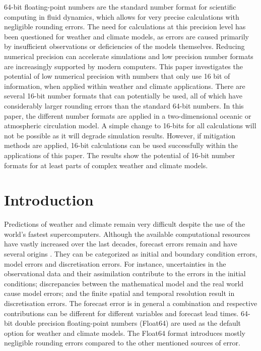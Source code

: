 \documentclass[draft]{agujournal2019}
\begin{document}
64-bit floating-point numbers are the standard number format for scientific
computing in fluid dynamics, which allows for very precise calculations with
negligible rounding errors. The need for calculations at this precision level
has been questioned for weather and climate models, as errors are caused
primarily by insufficient observations or deficiencies of the models themselves.
Reducing numerical precision can accelerate simulations and low precision number
formats are increasingly supported by modern computers. This paper investigates
the potential of low numerical precision with numbers that only use 16 bit of
information, when applied within weather and climate applications. There are
several 16-bit number formats that can potentially be used, all of which have
considerably larger rounding errors than the standard 64-bit numbers. In this
paper, the different number formats are applied in a two-dimensional oceanic or
atmospheric circulation model. A simple change to 16-bits for all calculations
will not be possible as it will degrade simulation results. However, if mitigation
methods are applied, 16-bit calculations can be used successfully within the
applications of this paper. The results show the potential of 16-bit number
formats for at least parts of complex weather and climate models.

\section{Introduction}
\label{sec:intro}

Predictions of weather and climate remain very difficult despite the use of the
world's fastest supercomputers. Although the available computational resources
have vastly increased over the last decades, forecast errors remain and have
several origins \cite{Palmer2012,Palmer2015}. They can be categorized as
initial and boundary condition errors, model errors and discretisation errors.
For instance, uncertainties in the observational data and their
assimilation contribute to the errors in the initial conditions; discrepancies
between the mathematical model and the real world cause model errors; and the finite
spatial and temporal resolution result in discretisation errors. The forecast error
is in general a combination and respective contributions can be different for
different variables and forecast lead times. 64-bit double precision floating-point
numbers (Float64) are used as the default option for weather and climate models.
The Float64 format introduces mostly negligible rounding errors compared to the
other mentioned sources of error.
\end{document}
